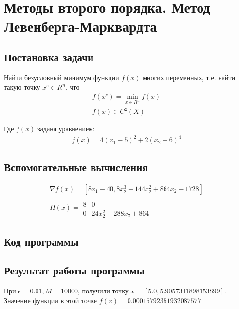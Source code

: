\section{Методы второго порядка. Метод Левенберга-Марквардта}
    \subsection{Постановка задачи}
        Найти безусловный минимум функции $f(x)$ многих переменных, т.е. найти такую точку $x^e \in R^n$, что 
        \begin{gather}
        f(x^e) = \min_{x \in R^n}f(x) \nonumber \\
        f(x) \in C^2(X) \nonumber
        \end{gather}

        Где $f(x)$ задана уравнением:
        \begin{gather}
        f(x) = 4(x_1 - 5)^2 + 2(x_2 - 6)^4 \nonumber
        \end{gather}

    \subsection{Вспомогательные вычисления}
        \begin{gather}
        \nabla f(x) = [ 8x_1 - 40, 8x_2^3 - 144x_2^2 + 864x_2 - 1728 ] \nonumber \\
        H(x) = \begin{array}{ll} \\ 8 & 0 \\ 0 & 24x_2^2 - 288x_2 + 864\end{array} \nonumber
        \end{gather}

    \subsection{Код программы}
        
    \subsection{Результат работы программы}
        При $\epsilon = 0.01, M = 10000$, получили точку $x = [5.0, 5.9057341898153899]$.
        Значение функции в этой точке $f(x) = 0.00015792351932087577$.